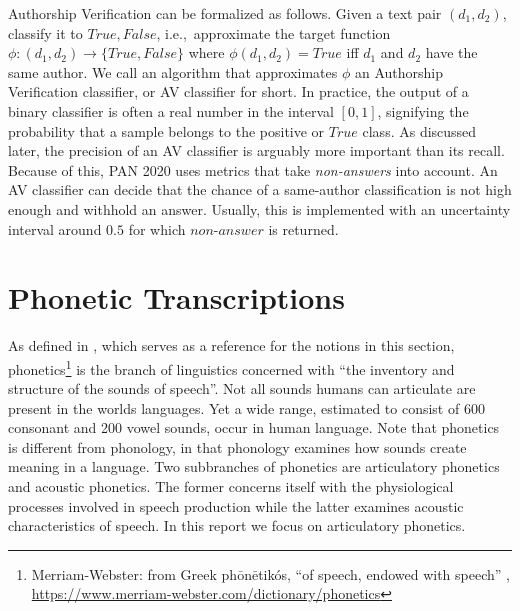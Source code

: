 Authorship Verification can be formalized as follows.
Given a text pair $(d_1, d_2)$, classify it to ${True, False}$, i.e.,\ approximate the target function $\phi{}:(d_1, d_2)\to\{True, False\}$ where $\phi(d_1, d_2)=True$ iff $d_1$ and $d_2$ have the same author.
We call an algorithm that approximates $\phi$ an Authorship Verification classifier, or AV classifier for short.
In practice, the output of a binary classifier is often a real number in the interval $[0,1]$, signifying the probability that a sample belongs to the positive or $True$ class.
As discussed later, the precision of an AV classifier is arguably more important than its recall.
Because of this, PAN 2020 uses metrics that take \textit{non-answers} into account.
An AV classifier can decide that the chance of a same-author classification is not high enough and withhold an answer.
Usually, this is implemented with an uncertainty interval around $0.5$ for which $non\text{-}answer$ is returned.


\section{Phonetic Transcriptions}\label{sec:phonetic_transcriptions}
As defined in \cite{ogrady2017introToLinguistics}, which serves as a reference for the notions in this section, phonetics\footnote{Merriam-Webster: from Greek ph$\bar{\mbox{o}}$n$\bar{\mbox{e}}$tik\'os, ``of speech, endowed with speech'' , \url{https://www.merriam-webster.com/dictionary/phonetics}} is the branch of linguistics concerned with ``the inventory and structure of the sounds of speech''.
Not all sounds humans can articulate are present in the worlds languages.
Yet a wide range, estimated to consist of 600 consonant and 200 vowel sounds, occur in human language.
Note that phonetics is different from phonology, in that phonology examines how sounds create meaning in a language.
Two subbranches of phonetics are articulatory phonetics and acoustic phonetics.
The former concerns itself with the physiological processes involved in speech production while the latter examines acoustic characteristics of speech.
In this report we focus on articulatory phonetics.

